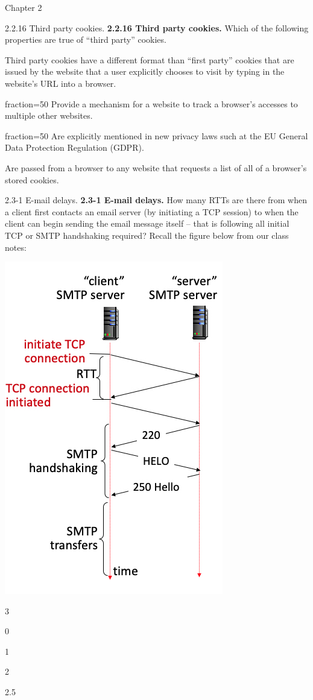 \documentclass[11pt]{article}
\begin{document}
\begin{quiz}{Chapter 2}
\begin{multi}[points=1,shuffle,multiple]{2.2.16 Third party cookies.}
\textbf{2.2.16 Third party cookies.} 
Which of the following properties are true of ``third party'' cookies.

\item Third party cookies have a different format than ``first party'' cookies that are issued by the website that a user explicitly chooses to visit by typing in the website's URL into a browser.
\item[fraction=50] Provide a mechanism for a website to track a browser's accesses to multiple other websites.
\item[fraction=50] Are explicitly mentioned in new privacy laws such at the EU General Data Protection Regulation (GDPR).
\item Are passed from a browser to any website that requests a list of all of a browser's stored cookies.
\end{multi}

\begin{multi}[points=1,shuffle]{2.3-1 E-mail delays.}
\textbf{2.3-1 E-mail delays.} 
How many RTTs are there from when a client first contacts an email server (by initiating a TCP session) to when the client can begin sending the email message itself -- that is following all initial TCP or SMTP handshaking required? 
Recall the figure below from our class notes: 
\begin{center}
\includegraphics[width=.4\linewidth]{figs/2.3.1.jpg}
\end{center}
\item* 3
\item 0
\item 1
\item 2
\item 2.5
\end{multi}


\end{quiz}
\end{document}

